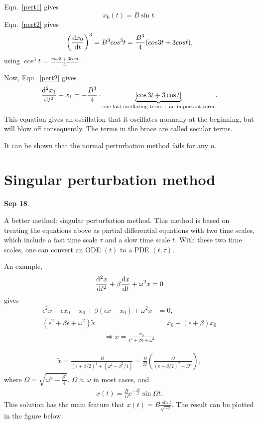 Equ.~\eqref{pert1} gives
\begin{equation}
x_0(t) = B\sin t.
\end{equation}
Equ.~\eqref{pert2} gives
\begin{equation}
\left(\frac{{\mathrm d} {x_0}}{{\mathrm d}t}\right)^3 = B^3 cos^3 t= \frac{B^3}{4}(cos 3t + 3 cos t),
\end{equation}
using  $ \cos^3 t= \frac{cos 3t + 3 cos t}{4}$. 

Now, Equ.~\eqref{pert2} gives
\begin{equation}
\frac{{\mathrm d}^2 {x_1}}{{\mathrm d}t^2}+ x_1 = -\frac{B^3}{4} \cdot \underbrace{\left[\cos 3t + 3 \cos t\right] }_{\text{one fast oscillating term $ + $ an important term}}.
\end{equation}
This equation gives an oscillation that it oscillates normally at the beginning, but will blow off consequently. The terms in the brace are called secular terms. 



It can be shown that the normal perturbation method fails for any $ n $. 

\section{Singular perturbation method}
\textbf{Sep 18}.

A better method: singular perturbation method. This method is based on treating the equations above as partial differential equations with two time scales, which include a fast time scale $ \tau $ and a slow time scale $ t $. With these two time scales, one can convert an ODE $ (t) $ to a PDE $ (t,\tau) $. 

An example,
\begin{equation}
\frac{{\mathrm d}^2 {x}}{{\mathrm d}t^2}+ \beta \frac{{\mathrm d} {x}}{{\mathrm d}t}+\omega^2 x=0
\end{equation}
gives
\begin{align}
\epsilon^2 \tilde{x} -\epsilon x_0 - \dot{x_0}+\beta (\epsilon \tilde{x}-x_0)+ \omega^2 \tilde{x}&=0,\\
(\epsilon^2+ \beta \epsilon + \omega^2)\tilde{x}&=\dot{x_0}+ (\epsilon + \beta)x_0
\end{align}
\begin{align}
\Rightarrow \tilde {x}= \frac{\dot{x_0}}{\epsilon^2+\beta \epsilon + \omega^2}
\end{align}

\begin{align}
\tilde{x}= \frac{B}{(\epsilon +\beta/2)^2 + (\omega^2-\beta^2/4)}=\frac{B}{\Omega}\left( \frac{\Omega}{(\epsilon+ \beta/2)^2+\Omega^2}\right),
\end{align}
where $ \Omega = \sqrt{\omega^2 - \frac{\beta^2}{4}} $.  $ \Omega \approx \omega $ in most cases, and 
\begin{align}
x(t)= \frac{B}{\Omega}e^{-\frac{\beta t}{2}}\sin \Omega t.\label {xtdamping} 
\end{align}
This solution has the main feature that $ x(t)=B \frac{\sin t}{\sqrt{\cdots t}} $. The result can be plotted in the figure below. 

